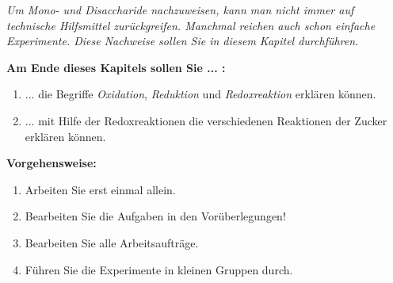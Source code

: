 \documentclass{scrartcl}  %
\begin{document}
		\textit{Um Mono- und Disaccharide nachzuweisen, kann man nicht immer auf technische Hilfsmittel zurückgreifen. Manchmal reichen auch schon einfache Experimente. Diese Nachweise sollen Sie in diesem Kapitel durchführen.} \newline

		\begin{minipage}{0.7\textwidth}
			\noindent \textbf{Am Ende dieses Kapitels sollen Sie ... :}
			\begin{enumerate}
				\item ... die Begriffe \textit{Oxidation}, \textit{Reduktion} und \textit{Redoxreaktion} erklären können.
				\item ... mit Hilfe der Redoxreaktionen die verschiedenen Reaktionen der Zucker erklären können.
			\end{enumerate}
			\textbf{Vorgehensweise:}
			\begin{enumerate}
				\item Arbeiten Sie erst einmal allein.
				\item Bearbeiten Sie die Aufgaben in den Vorüberlegungen!
				\item Bearbeiten Sie alle Arbeitsaufträge.
				\item Führen Sie die Experimente in kleinen Gruppen durch.
			\end{enumerate}
			
		\end{minipage}
		\hspace{0.1\textwidth}
\end{document}
